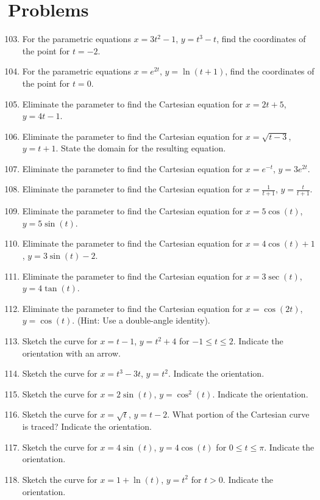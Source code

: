 \documentclass{article}
\begin{document}
\section*{Problems}
\begin{enumerate}
    \setcounter{enumi}{102}
    \item For the parametric equations $x = 3t^2 - 1$, $y = t^3 - t$, find the coordinates of the point for $t = -2$.
    \item For the parametric equations $x = e^{2t}$, $y = \ln(t+1)$, find the coordinates of the point for $t = 0$.
    \item Eliminate the parameter to find the Cartesian equation for $x = 2t + 5$, $y = 4t - 1$.
    \item Eliminate the parameter to find the Cartesian equation for $x = \sqrt{t-3}$, $y = t+1$. State the domain for the resulting equation.
    \item Eliminate the parameter to find the Cartesian equation for $x = e^{-t}$, $y = 3e^{2t}$.
    \item Eliminate the parameter to find the Cartesian equation for $x = \frac{1}{t+1}$, $y = \frac{t}{t+1}$.
    \item Eliminate the parameter to find the Cartesian equation for $x = 5\cos(t)$, $y = 5\sin(t)$.
    \item Eliminate the parameter to find the Cartesian equation for $x = 4\cos(t) + 1$, $y = 3\sin(t) - 2$.
    \item Eliminate the parameter to find the Cartesian equation for $x = 3\sec(t)$, $y = 4\tan(t)$.
    \item Eliminate the parameter to find the Cartesian equation for $x = \cos(2t)$, $y = \cos(t)$. (Hint: Use a double-angle identity).
    \item Sketch the curve for $x = t-1$, $y = t^2+4$ for $-1 \le t \le 2$. Indicate the orientation with an arrow.
    \item Sketch the curve for $x = t^3 - 3t$, $y = t^2$. Indicate the orientation.
    \item Sketch the curve for $x = 2\sin(t)$, $y = \cos^2(t)$. Indicate the orientation.
    \item Sketch the curve for $x = \sqrt{t}$, $y = t - 2$. What portion of the Cartesian curve is traced? Indicate the orientation.
    \item Sketch the curve for $x = 4\sin(t)$, $y = 4\cos(t)$ for $0 \le t \le \pi$. Indicate the orientation.
    \item Sketch the curve for $x = 1 + \ln(t)$, $y = t^2$ for $t > 0$. Indicate the orientation.

\end{enumerate}
\end{document}
